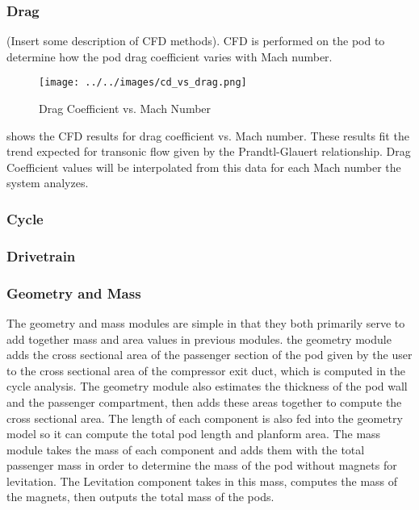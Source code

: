 \subsubsection{Drag}
(Insert some description of CFD methods).
CFD is performed on the pod to determine how the pod drag coefficient varies with Mach number. 
\begin{figure}
	\centering
	\texttt{[image: ../../images/cd\_vs\_drag.png]}
	\caption{Drag Coefficient vs. Mach Number}
	\label{fig:cd_vs_mach}
\end{figure}
 shows the CFD results for drag coefficient vs. Mach number. These results fit the trend expected for transonic flow given by the Prandtl-Glauert relationship. Drag Coefficient values will be interpolated from this data for each Mach number the system analyzes.
\subsubsection{Cycle}
\subsubsection{Drivetrain}
\subsubsection{Geometry and Mass}
The geometry and mass modules are simple in that they both primarily serve to add together mass and area values in previous modules. the geometry module adds the cross sectional area of the passenger section of the pod given by the user to the cross sectional area of the compressor exit duct, which is computed in the cycle analysis. The geometry module also estimates the thickness of the pod wall and the passenger compartment, then adds these areas together to compute the cross sectional area. The length of each component is also fed into the geometry model so it can compute the total pod length and planform area. The mass module takes the mass of each component and adds them with the total passenger mass in order to determine the mass of the pod without magnets for levitation. The Levitation component takes in this mass, computes the mass of the magnets, then outputs the total mass of the pods.
